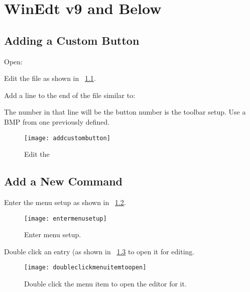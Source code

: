 \documentclass{lebook}
\begin{document}
\chapter{WinEdt v9 and Below}
\section{Adding a Custom Button}

\begin{numberedlist}
	\item Open: 
	
	\item Edit the  file as shown in \figurename~\ref{fig:addcustombutton}.
	
	\item Add a line to the end of the file similar to:
	\begin{plainlist}
		\item {}
		\item {}
		\item {}
		\item {}
	\end{plainlist}
\end{numberedlist}
The number in that line will be the button number is the toolbar setup.
Use a BMP from one previously defined.
\begin{figure}
	\centering
	\texttt{[image: addcustombutton]}
	\caption{Edit the }
	\label{fig:addcustombutton}
\end{figure}



\section{Add a New Command}
Enter the menu setup as shown in \figurename~\ref{fig:entermenusetup}.
\begin{figure}
	\centering
	\texttt{[image: entermenusetup]}
	\caption{Enter menu setup.}
	\label{fig:entermenusetup}
\end{figure}

Double click an entry (as shown in \figurename~\ref{fig:doubleclickmenuitemtoopen} to open it for editing.
\begin{figure}
	\centering
	\texttt{[image: doubleclickmenuitemtoopen]}
	\caption{Double click the menu item to open the editor for it.}
	\label{fig:doubleclickmenuitemtoopen}
\end{figure}
\end{document}
